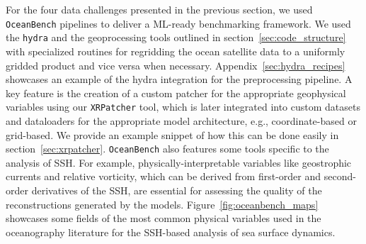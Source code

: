 For the four data challenges presented in the previous section, we used \texttt{OceanBench} pipelines to deliver a ML-ready benchmarking framework.
We used the \texttt{hydra} and the geoprocessing tools outlined in section~\ref{sec:code_structure} with specialized routines for regridding the ocean satellite data to a uniformly gridded product and vice versa when necessary. 
Appendix~\ref{sec:hydra_recipes} showcases an example of the hydra integration for the preprocessing pipeline. 
A key feature is the creation of a custom patcher for the appropriate geophysical variables using our \texttt{XRPatcher} tool, which is later integrated into custom datasets and dataloaders for the appropriate model architecture, e.g., coordinate-based or grid-based. 
We provide an example snippet of how this can be done easily in section~\ref{sec:xrpatcher}.
\texttt{OceanBench} also features some tools specific to the analysis of SSH. 
For example, physically-interpretable variables like geostrophic currents and relative vorticity, which can be derived from first-order and second-order derivatives of the SSH, are essential for assessing the quality of the reconstructions generated by the models. 
Figure~\ref{fig:oceanbench_maps} showcases some fields of the most common physical variables used in the oceanography literature for the SSH-based analysis of sea surface dynamics.



% 












